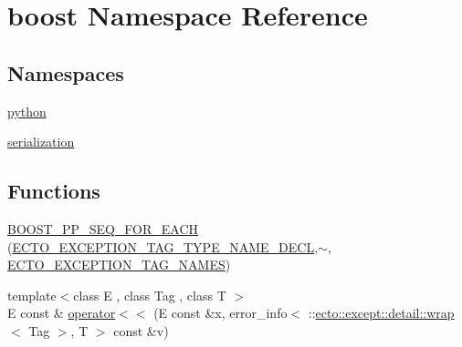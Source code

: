 \hypertarget{namespaceboost}{\section{boost Namespace Reference}
\label{namespaceboost}
}
\subsection*{Namespaces}
\begin{DoxyCompactItemize}
\item 
\hyperlink{namespaceboost_1_1python}{python}
\item 
\hyperlink{namespaceboost_1_1serialization}{serialization}
\end{DoxyCompactItemize}
\subsection*{Functions}
\begin{DoxyCompactItemize}
\item 
\hyperlink{namespaceboost_ac098a4e20f2e80e827e2022ad264473a}{B\-O\-O\-S\-T\-\_\-\-P\-P\-\_\-\-S\-E\-Q\-\_\-\-F\-O\-R\-\_\-\-E\-A\-C\-H} (\hyperlink{except_8hpp_a61f61285d4749b701b559d10678908a4}{E\-C\-T\-O\-\_\-\-E\-X\-C\-E\-P\-T\-I\-O\-N\-\_\-\-T\-A\-G\-\_\-\-T\-Y\-P\-E\-\_\-\-N\-A\-M\-E\-\_\-\-D\-E\-C\-L},$\sim$, \hyperlink{except_8hpp_a6a632b3827deba566cbca48b37bf53e2}{E\-C\-T\-O\-\_\-\-E\-X\-C\-E\-P\-T\-I\-O\-N\-\_\-\-T\-A\-G\-\_\-\-N\-A\-M\-E\-S})
\item 
{\footnotesize template$<$class E , class Tag , class T $>$ }\\E const \& \hyperlink{namespaceboost_a54199d7ccb025863b84b2b597328302c}{operator$<$$<$} (E const \&x, error\-\_\-info$<$ \-::\hyperlink{structecto_1_1except_1_1detail_1_1wrap}{ecto\-::except\-::detail\-::wrap}$<$ Tag $>$, T $>$ const \&v)
\end{DoxyCompactItemize}


